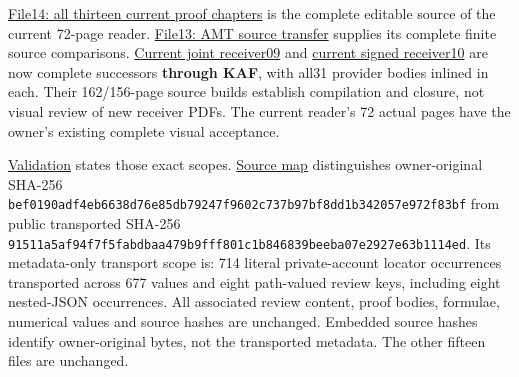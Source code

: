 \documentclass[
]{article}
\begin{document}
\href{https://github.com/KokunoYumeto/zeta-function-research-reader/blob/5817ef9027257375b6ff3de7048b3331077251e7/workbenches/splitzero-tandem/continuations/20260914-original-kernel-matrices/14_CURRENT_KERNEL_AND_MULTIPLICITY_PROOFS.tex}{File14:
all thirteen current proof chapters} is the complete editable source of
the current 72-page reader.
\href{https://github.com/KokunoYumeto/zeta-function-research-reader/blob/5817ef9027257375b6ff3de7048b3331077251e7/workbenches/splitzero-tandem/continuations/20260914-original-kernel-matrices/13_ARITHMETIC_MIXED_TRANSFER.tex}{File13:
AMT source transfer} supplies its complete finite source comparisons.
\href{https://github.com/KokunoYumeto/zeta-function-research-reader/blob/5817ef9027257375b6ff3de7048b3331077251e7/workbenches/splitzero-tandem/continuations/20260914-original-kernel-matrices/09_UPDATED_JOINT_NOTE.tex}{Current
joint receiver09} and
\href{https://github.com/KokunoYumeto/zeta-function-research-reader/blob/5817ef9027257375b6ff3de7048b3331077251e7/workbenches/splitzero-tandem/continuations/20260914-original-kernel-matrices/10_UPDATED_SIGNED_RETURN.tex}{current
signed receiver10} are now complete successors \textbf{through KAF},
with all31 provider bodies inlined in each. Their 162/156-page source
builds establish compilation and closure, not visual review of new
receiver PDFs. The current reader's 72 actual pages have the owner's
existing complete visual acceptance.

\href{https://github.com/KokunoYumeto/zeta-function-research-reader/blob/5817ef9027257375b6ff3de7048b3331077251e7/workbenches/splitzero-tandem/continuations/20260914-original-kernel-matrices/12_VALIDATION.md}{Validation}
states those exact scopes.
\href{https://github.com/KokunoYumeto/zeta-function-research-reader/blob/5817ef9027257375b6ff3de7048b3331077251e7/workbenches/splitzero-tandem/continuations/20260914-original-kernel-matrices/11_SOURCE_MAP.json}{Source
map} distinguishes owner-original SHA-256
\texttt{bef0190adf4eb6638d76e85db79247f9602c737b97bf8dd1b342057e972f83bf}
from public transported SHA-256
\texttt{91511a5af94f7f5fabdbaa479b9fff801c1b846839beeba07e2927e63b1114ed}.
Its metadata-only transport scope is: 714 literal private-account
locator occurrences transported across 677 values and eight path-valued
review keys, including eight nested-JSON occurrences. All associated
review content, proof bodies, formulae, numerical values and source
hashes are unchanged. Embedded source hashes identify owner-original
bytes, not the transported metadata. The other fifteen files are
unchanged.
\end{document}
